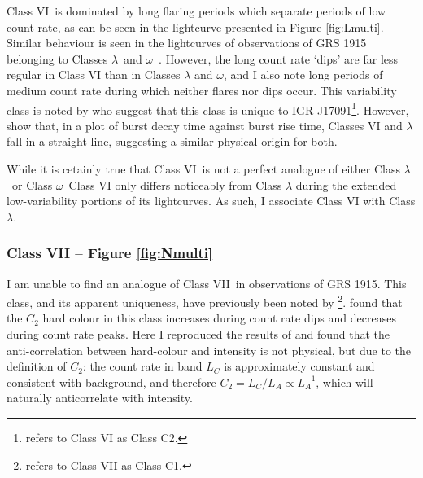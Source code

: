 \par Class VI\indexvi\ is dominated by long flaring periods which separate periods of low count rate, as can be seen in the lightcurve presented in Figure \ref{fig:Lmulti}.  Similar behaviour is seen in the lightcurves of observations of GRS 1915 belonging to Classes $\lambda$\indexlambda\ and $\omega$\indexomega\ \citep{KleinWolt_OmegaClass}.  However, the long count rate `dips' are far less regular in Class VI than in Classes $\lambda$ and $\omega$, and I also note long periods of medium count rate during which neither flares nor dips occur.  This variability class is noted by \citet{Pahari_IGRClasses} who suggest that this class is unique to IGR J17091\footnote{\citet{Pahari_IGRClasses} refers to Class VI as Class C2.}.  However, \citet{Pahari_ClassVI} show that, in a plot of burst decay time against burst rise time, Classes VI and $\lambda$ fall in a straight line, suggesting a similar physical origin for both.
\par While it is cetainly true that Class VI\indexvi\ is not a perfect analogue of either Class $\lambda$\indexlambda\ or Class $\omega$\indexomega\, Class VI only differs noticeably from Class $\lambda$ during the extended low-variability portions of its lightcurves.  As such, I associate Class VI with Class $\lambda$.

\subsubsection{Class VII -- Figure \ref{fig:Nmulti}}

\par I am unable to find an analogue of Class VII\indexvii\ in observations of GRS 1915.  This class, and its apparent uniqueness, have previously been noted by \citealp{Pahari_IGRClasses}\footnote{\citet{Pahari_IGRClasses} refers to Class VII as Class C1.}.  \citeauthor{Pahari_IGRClasses} found  that the $C_2$ hard colour in this class increases during count rate dips and decreases during count rate peaks.  Here I reproduced the results of \citeauthor{Pahari_IGRClasses} and found that the anti-correlation between hard-colour and intensity is not physical, but due to the definition of $C_2$: the count rate in band $L_C$ is approximately constant and consistent with background, and therefore $C_2=L_C/L_A \propto L_A^{-1}$, which will naturally anticorrelate with intensity.

